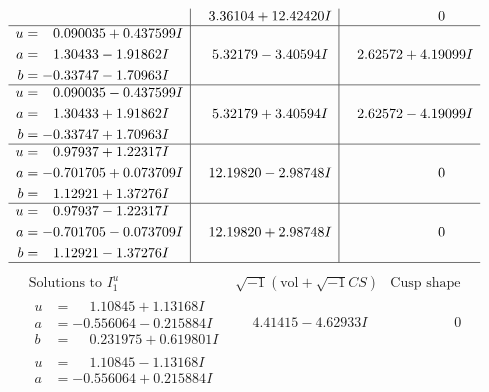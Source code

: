 \documentclass[1p]{elsarticle_modified}
\theoremstyle{definition}
\newcommand{\I}{\sqrt{-1}}
\begin{document}
$$\begin{array}{c|c|c}
 & \phantom{-}3.36104 + 12.42420 I & \phantom{-0.000000 } 0 \\ \hline\begin{aligned}
u &= \phantom{-}0.090035 + 0.437599 I \\
a &= \phantom{-}1.30433 - 1.91862 I \\
b &= -0.33747 - 1.70963 I\end{aligned}
 & \phantom{-}5.32179 - 3.40594 I & \phantom{-}2.62572 + 4.19099 I \\ \hline\begin{aligned}
u &= \phantom{-}0.090035 - 0.437599 I \\
a &= \phantom{-}1.30433 + 1.91862 I \\
b &= -0.33747 + 1.70963 I\end{aligned}
 & \phantom{-}5.32179 + 3.40594 I & \phantom{-}2.62572 - 4.19099 I \\ \hline\begin{aligned}
u &= \phantom{-}0.97937 + 1.22317 I \\
a &= -0.701705 + 0.073709 I \\
b &= \phantom{-}1.12921 + 1.37276 I\end{aligned}
 & \phantom{-}12.19820 - 2.98748 I & \phantom{-0.000000 } 0 \\ \hline\begin{aligned}
u &= \phantom{-}0.97937 - 1.22317 I \\
a &= -0.701705 - 0.073709 I \\
b &= \phantom{-}1.12921 - 1.37276 I\end{aligned}
 & \phantom{-}12.19820 + 2.98748 I & \phantom{-0.000000 } 0\\
 \hline 
 \end{array}$$\newpage$$\begin{array}{c|c|c}  
\text{Solutions to }I^u_{1}& \I (\text{vol} + \sqrt{-1}CS) & \text{Cusp shape}\\
 \hline 
\begin{aligned}
u &= \phantom{-}1.10845 + 1.13168 I \\
a &= -0.556064 - 0.215884 I \\
b &= \phantom{-}0.231975 + 0.619801 I\end{aligned}
 & \phantom{-}4.41415 - 4.62933 I & \phantom{-0.000000 } 0 \\ \hline\begin{aligned}
u &= \phantom{-}1.10845 - 1.13168 I \\
a &= -0.556064 + 0.215884 I \\

\end{aligned}
\end{array}$$
\end{document}
